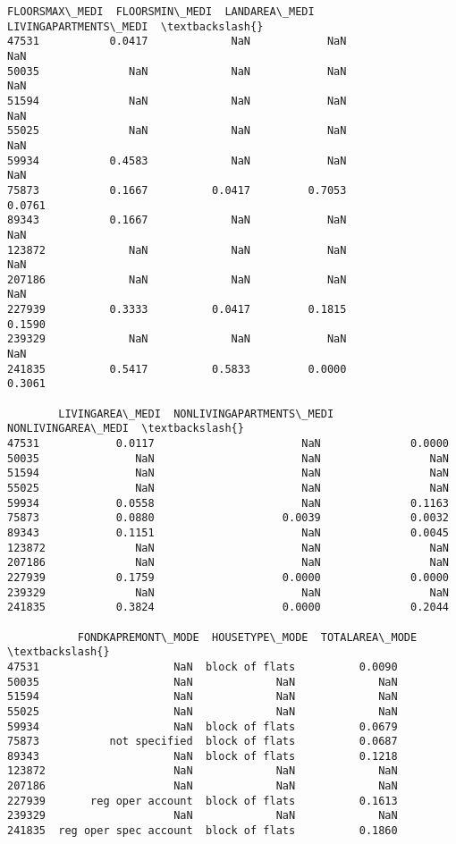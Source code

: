 \documentclass[11pt]{article}
\begin{document}
\begin{tcolorbox}[breakable, size=fbox, boxrule=.5pt, pad at break*=1mm, opacityfill=0]
\begin{Verbatim}[commandchars=\\\{\}]
        FLOORSMAX\_MEDI  FLOORSMIN\_MEDI  LANDAREA\_MEDI  LIVINGAPARTMENTS\_MEDI  \textbackslash{}
47531           0.0417             NaN            NaN                    NaN
50035              NaN             NaN            NaN                    NaN
51594              NaN             NaN            NaN                    NaN
55025              NaN             NaN            NaN                    NaN
59934           0.4583             NaN            NaN                    NaN
75873           0.1667          0.0417         0.7053                 0.0761
89343           0.1667             NaN            NaN                    NaN
123872             NaN             NaN            NaN                    NaN
207186             NaN             NaN            NaN                    NaN
227939          0.3333          0.0417         0.1815                 0.1590
239329             NaN             NaN            NaN                    NaN
241835          0.5417          0.5833         0.0000                 0.3061

        LIVINGAREA\_MEDI  NONLIVINGAPARTMENTS\_MEDI  NONLIVINGAREA\_MEDI  \textbackslash{}
47531            0.0117                       NaN              0.0000
50035               NaN                       NaN                 NaN
51594               NaN                       NaN                 NaN
55025               NaN                       NaN                 NaN
59934            0.0558                       NaN              0.1163
75873            0.0880                    0.0039              0.0032
89343            0.1151                       NaN              0.0045
123872              NaN                       NaN                 NaN
207186              NaN                       NaN                 NaN
227939           0.1759                    0.0000              0.0000
239329              NaN                       NaN                 NaN
241835           0.3824                    0.0000              0.2044

           FONDKAPREMONT\_MODE  HOUSETYPE\_MODE  TOTALAREA\_MODE  \textbackslash{}
47531                     NaN  block of flats          0.0090
50035                     NaN             NaN             NaN
51594                     NaN             NaN             NaN
55025                     NaN             NaN             NaN
59934                     NaN  block of flats          0.0679
75873           not specified  block of flats          0.0687
89343                     NaN  block of flats          0.1218
123872                    NaN             NaN             NaN
207186                    NaN             NaN             NaN
227939       reg oper account  block of flats          0.1613
239329                    NaN             NaN             NaN
241835  reg oper spec account  block of flats          0.1860


\end{Verbatim}
\end{tcolorbox}
\end{document}
